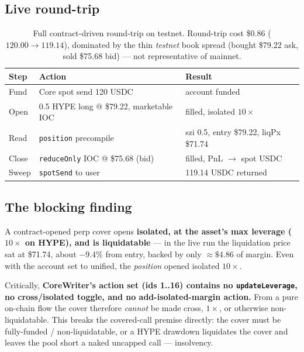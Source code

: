 \documentclass[11pt]{article}
\newcommand{\code}[1]{\texttt{\small #1}}
\begin{document}
\subsection{Live round-trip}
\begin{table}[h]
\centering
\begin{tabular}{@{}lll@{}}
\toprule
\textbf{Step} & \textbf{Action} & \textbf{Result} \\
\midrule
Fund  & Core spot send 120 USDC & account funded \\
Open  & 0.5 HYPE long @ \$79.22, marketable IOC & filled, isolated $10\times$ \\
Read  & \code{position} precompile & szi 0.5, entry \$79.22, liqPx \$71.74 \\
Close & \code{reduceOnly} IOC @ \$75.68 (bid) & filled, PnL $\to$ spot USDC \\
Sweep & \code{spotSend} to user & 119.14 USDC returned \\
\bottomrule
\end{tabular}
\caption{Full contract-driven round-trip on testnet. Round-trip cost \$0.86
($120.00 \to 119.14$), dominated by the thin \emph{testnet} book spread (bought \$79.22 ask, sold
\$75.68 bid) --- not representative of mainnet.}
\label{tab:roundtrip}
\end{table}

\subsection{The blocking finding}
A contract-opened perp cover opens \textbf{isolated, at the asset's max leverage ($10\times$ on HYPE),
and is liquidatable} --- in the live run the liquidation price sat at \$71.74, about $-9.4\%$ from
entry, backed by only $\approx\$4.86$ of margin. Even with the account set to unified, the
\emph{position} opened isolated $10\times$.

Critically, \textbf{CoreWriter's action set (ids 1..16) contains no \code{updateLeverage}, no
cross/isolated toggle, and no add-isolated-margin action.} From a pure on-chain flow the cover
therefore \emph{cannot} be made cross, $1\times$, or otherwise non-liquidatable. This breaks the
covered-call premise directly: the cover must be fully-funded / non-liquidatable, or a HYPE drawdown
liquidates the cover and leaves the pool short a naked uncapped call --- insolvency.
\end{document}
